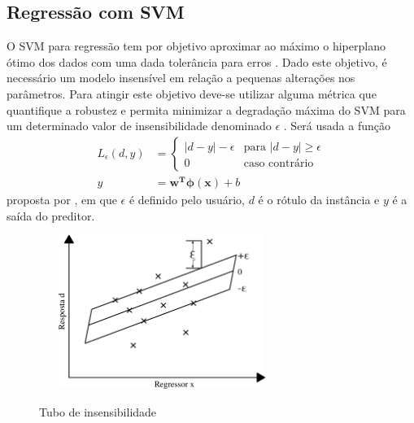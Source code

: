 \subsection{Regressão com SVM}
O SVM para regressão tem por objetivo aproximar ao máximo o hiperplano ótimo dos dados com uma dada tolerância para erros \cite{LIMA2004}. Dado este objetivo, é necessário um modelo insensível em relação a pequenas alterações nos parâmetros. Para atingir este objetivo deve-se utilizar alguma métrica que quantifique a robustez e permita minimizar a degradação máxima do SVM para um determinado valor de insensibilidade denominado \(\epsilon\) \cite{Haykin2007}. Será usada a função
\begin{align}
L_{\epsilon}(d, y) &= 	\begin{cases}\label{EQU_FUNCAO_PERDA_VAPNIK}
							|d - y| - \epsilon  &\textrm{para } |d - y| \geq \epsilon \\
							0					&\textrm{caso contrário}
						\end{cases} \\
y &= \mathbf{w^{T}}\bm{\phi(x)} + b
\end{align}
proposta por , em que \(\epsilon\) é definido pelo usuário, \(d\) é o rótulo da instância e \(y\) é a saída do preditor. 
\begin{figure}[hbt]
  \centering
  \caption{Tubo de insensibilidade}
  \includegraphics[width=8cm,height=5cm]{./secoes/conceitosFundamentais/pics/img/tuboRobustez.eps}
  \label{FIGURA_SVM_TUBO_INSENSIBILIDADE}
\end{figure}

